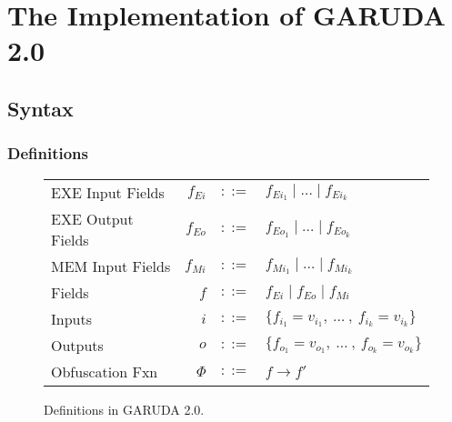 \documentclass[12pt, letterpaper]{article}
\def \sysname {\textsc{GARUDA 2.0}\xspace}
\begin{document}


  \section{The Implementation of \sysname}\label{sec:spec}

    \subsection{Syntax}\label{sec:spec:synt}
      \subsubsection{Definitions}\label{sec:spec:synt:defn}
        \begin{figure}
          \centering
          \begin{tabular}{l r c l}
            EXE Input Fields  & $f_{Ei}$  & $::=$ & $f_{Ei_{1}} \mid \dots \mid f_{Ei_{k}}$\\
            EXE Output Fields & $f_{Eo}$  & $::=$ & $f_{Eo_{1}} \mid \dots \mid f_{Eo_{k}}$\\
            MEM Input Fields  & $f_{Mi}$  & $::=$ & $f_{Mi_{1}} \mid \dots \mid f_{Mi_{k}}$\\
            Fields            & $f$       & $::=$ & $f_{Ei} \mid f_{Eo} \mid f_{Mi} $ \\
            Inputs            & $i$       & $::=$ & $\{f_{i_{1}} = v_{i_{1}} ,\ \dots\ ,\ f_{i_{k}} = v_{i_{k}}\}$\\
            Outputs           & $o$       & $::=$ & $\{f_{o_{1}} = v_{o_{1}} ,\ \dots\ ,\ f_{o_{k}} = v_{o_{k}}\}$\\
            Obfuscation Fxn   & $\Phi$    & $::=$ & $f \rightarrow f'$
          \end{tabular}
          \caption{Definitions in \sysname.}
          \label{fig:spec:synt:defn}
        \end{figure}
\end{document}
